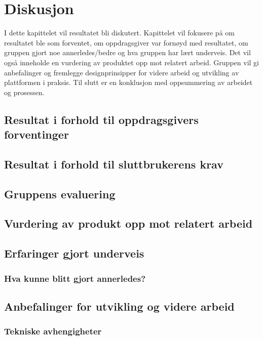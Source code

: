 \cleardoublepage
\chapter{Diskusjon}
\label{chap:discussion} 

I dette kapittelet vil resultatet bli diskutert. Kapittelet vil fokusere på om resultatet ble som forventet, om oppdragsgiver var fornøyd med resultatet, om gruppen gjort noe annerledes/bedre og hva gruppen har lært underveis. Det vil også inneholde en vurdering av produktet opp mot relatert arbeid. Gruppen vil gi anbefalinger og fremlegge designprinsipper for videre arbeid og utvikling av plattformen i praksis. Til slutt er en konklusjon med oppsummering av arbeidet og prosessen.

\section{Resultat i forhold til oppdragsgivers forventinger}

\section{Resultat i forhold til sluttbrukerens krav}

\section{Gruppens evaluering}

\section{Vurdering av produkt opp mot relatert arbeid}

\section{Erfaringer gjort underveis}
\subsection{Hva kunne blitt gjort annerledes?}

\section{Anbefalinger for utvikling og videre arbeid}
\label{section:anbefaling-videre-utvikling}

\subsection{Tekniske avhengigheter}

